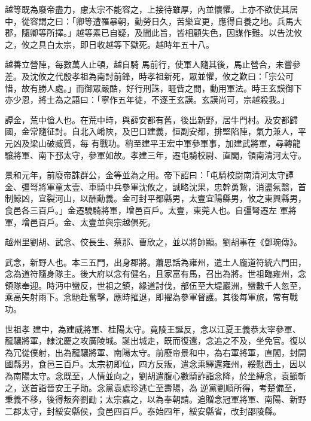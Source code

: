\begin{pinyinscope}
 越等既為廢帝盡力，慮太宗不能容之，上接待雖厚，內並懷懼。上亦不欲使其居中，從容謂之曰：「卿等遭罹暴朝，勤勞日久，苦樂宜更，應得自養之地。兵馬大郡，隨卿等所擇。」越等素已自疑，及聞此旨，皆相顧失色，因謀作難。以告沈攸之，攸之具白太宗，即日收越等下獄死。越時年五十八。



 越善立營陣，每數萬人止頓，越自騎
 馬前行，使軍人隨其後，馬止營合，未嘗參差。及沈攸之代殷孝祖為南討前鋒，時孝祖新死，眾並懼，攸之歎曰：「宗公可惜，故有勝人處。」而御眾嚴酷，好行刑誅，睚眥之間，動用軍法。時王玄謨御下亦少恩，將士為之語曰：「寧作五年徒，不逐王玄謨。玄謨尚可，宗越殺我。」



 譚金，荒中傖人也。在荒中時，與薛安都有舊，後出新野，居牛門村。及安都歸國，金常隨征討。自北入崤陜，及巴口建義，恒副安都，排堅陷陣，氣力兼人，平元凶及梁山破臧質，每
 有戰功。稍至建平王宏中軍參軍事，加建武將軍，尋轉龍驤將軍、南下邳太守，參軍如故。孝建三年，遷屯騎校尉、直閣，領南清河太守。



 景和元年，前廢帝誅群公，金等並為之用。帝下詔曰：「屯騎校尉南清河太守譚金、彊弩將軍童太壹、車騎中兵參軍沈攸之，誠略沈果，忠幹勇鷙，消盪氛翳，首制鯨凶，宜裂河山，以酬勳義。金可封平都縣男，太壹宜陽縣男，攸之東興縣男，食邑各三百戶。」金遷驍騎將軍，增邑百戶。太壹，東莞人也。自彊弩遷左
 軍將軍，增邑百戶。金、太壹並與宗越俱死。



 越州里劉胡、武念、佼長生、蔡那、曹欣之，並以將帥顯。劉胡事在《鄧琬傳》。



 武念，新野人也。本三五門，出身郡將。蕭思話為雍州，遣土人龐道符統六門田，念為道符隨身隊主。後大府以念有健名，且家富有馬，召出為將。世祖臨雍州，念領隊奉迎。時沔中蠻反，世祖之鎮，緣道討伐，部伍至大堤巖洲，蠻數千人忽至，乘高矢射雨下。念馳赴奮擊，應時摧退，即擢為參軍督護。其後每軍旅，常有戰功。



 世祖孝
 建中，為建威將軍、桂陽太守。竟陵王誕反，念以江夏王義恭太宰參軍、龍驤將軍，隸沈慶之攻廣陵城。誕出城走，既而復還，念追之不及，坐免官。復以為冗從僕射，出為龍驤將軍、南陽太守。前廢帝景和中，為右軍將軍，直閣，封開國縣男，食邑三百戶。太宗初即位，四方反叛，遣念乘驛還雍州，綏慰西土，因以為南陽太守。念既至，人情並向之，劉胡遣腹心數騎詐詣念降，於坐縛念，袁顗斬之，送首詣晉安王子勛。念黨袁處珍逃亡至壽陽，為
 逆黨劉順所得，考楚備至，秉義不移，後得叛奔劉勔；太宗嘉之，以為奉朝請。追贈念冠軍將軍、南陽、新野二郡太守，封綏安縣侯，食邑四百戶。泰始四年，綏安縣省，改封邵陵縣。




\end{pinyinscope}
